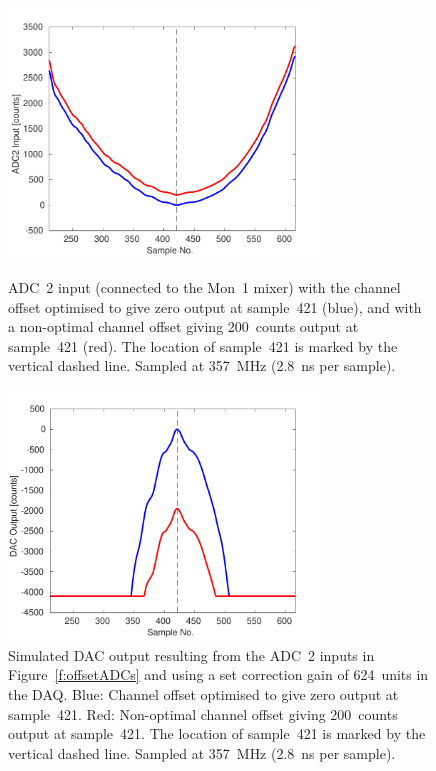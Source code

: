 \begin{figure}
  \centering
  \includegraphics[width=0.75\textwidth]{Figures/commissioning/offsetADCs}
  \caption{ADC~2 input (connected to the Mon~1 mixer) with the channel offset optimised to give zero output at sample~421 (blue), and with a non-optimal channel offset giving 200~counts output at sample~421 (red). The location of sample~421 is marked by the vertical dashed line. Sampled at 357~MHz (2.8~ns per sample).}
  \label{f:offsetADCs}
  \centering
  \includegraphics[width=0.75\textwidth]{Figures/commissioning/offsetDACs}
  \caption{Simulated DAC output resulting from the ADC~2 inputs in Figure~\ref{f:offsetADCs} and using a set correction gain of 624~units in the DAQ.  Blue: Channel offset optimised to give zero output at sample~421. Red: Non-optimal channel offset giving 200~counts output at sample~421. The location of sample~421 is marked by the vertical dashed line. Sampled at 357~MHz (2.8~ns per sample).}
  \label{f:offsetDACs}
\end{figure}


